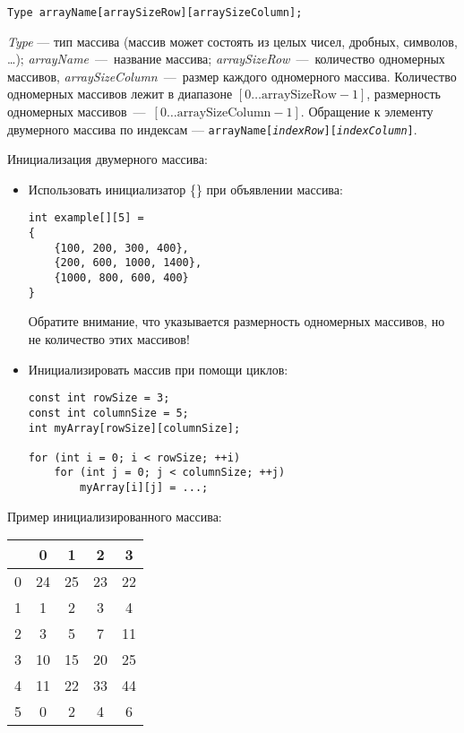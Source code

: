\lstinline|Type arrayName[arraySizeRow][arraySizeColumn];|

\textit{Type} --- тип массива (массив может состоять из целых чисел, дробных, символов, \ldots); \textit{arrayName}~---~название массива; \textit{arraySizeRow}~---~количество одномерных массивов, \textit{arraySizeColumn}~---~размер каждого одномерного массива. Количество одномерных массивов лежит в диапазоне $\left[ 0 \ldots \text{arraySizeRow} - 1 \right]$, размерность одномерных массивов~---~$\left[ 0 \ldots \text{arraySizeColumn} - 1 \right]$. Обращение к элементу двумерного массива по индексам --- \texttt{arrayName[\textit{indexRow}][\textit{indexColumn}]}.

Инициализация двумерного массива:
\begin{itemize}
    \item Использовать инициализатор \{\} при объявлении массива:
    \begin{lstlisting}
int example[][5] =
{
    {100, 200, 300, 400},
    {200, 600, 1000, 1400},
    {1000, 800, 600, 400}
}
    \end{lstlisting}

    Обратите внимание, что указывается размерность одномерных массивов, но не количество этих массивов!

    \item Инициализировать массив при помощи циклов:
    \begin{lstlisting}
const int rowSize = 3;
const int columnSize = 5;
int myArray[rowSize][columnSize];

for (int i = 0; i < rowSize; ++i)
    for (int j = 0; j < columnSize; ++j)
        myArray[i][j] = ...;
    \end{lstlisting}
\end{itemize}

Пример инициализированного массива:
\begin{table}[h]
    \begin{tabular}{|c|c|c|c|c|}
        \hline
          & 0 & 1 & 2 & 3 \\
        \hline
        0 & 24 & 25 & 23 & 22 \\
        \hline
        1 & 1 & 2 & 3 & 4 \\
        \hline
        2 & 3 & 5 & 7 & 11 \\
        \hline
        3 & 10 & 15 & 20 & 25 \\
        \hline
        4 & 11 & 22 & 33 & 44 \\
        \hline
        5 & 0 & 2 & 4 & 6 \\
        \hline
    \end{tabular}
\end{table}


